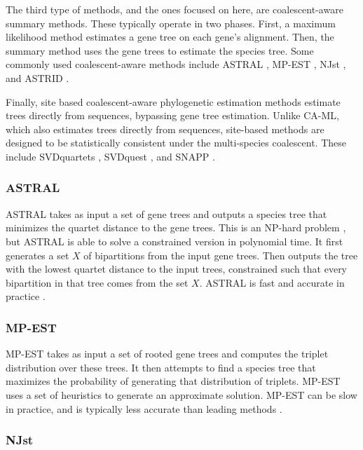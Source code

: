 \documentclass[tocnosub,noragright,centerchapter,fullpagesingle,12pt]{uiuc_csthesis18}
\begin{document}
The third type of methods, and the ones focused on here, are coalescent-aware summary methods. These typically operate in two phases. First, a maximum likelihood method estimates a gene tree on each gene's alignment. Then, the summary method uses the gene trees to estimate the species tree. Some commonly used coalescent-aware methods include ASTRAL \cite{mirarab2014astral,mirarab2015astral,astral3,ASTRAL-MP}, MP-EST \cite{MPEST}, NJst \cite{liu2011estimating}, and ASTRID \cite{vachaspati2015astrid}. 

Finally, site based coalescent-aware phylogenetic estimation methods estimate trees directly from sequences, bypassing gene tree estimation. Unlike CA-ML, which also estimates trees directly from sequences, site-based methods are designed to be statistically consistent under the multi-species coalescent.  These include SVDquartets \cite{chifman2014quartet}, SVDquest \cite{vachaspati2018svdquest}, and SNAPP \cite{bryant2012inferring}.

\subsubsection{ASTRAL}

ASTRAL takes as input a set of gene trees and outputs a species tree that minimizes the quartet distance to the gene trees. This is an NP-hard problem \cite{jiang2001polynomial}, but ASTRAL is able to solve a constrained version in polynomial time. It first generates a set $X$ of bipartitions from the input gene trees. Then outputs the tree with the lowest quartet distance to the input trees, constrained such that every bipartition in that tree comes from the set $X$. ASTRAL is fast and accurate in practice \cite{ASTRAL-MP,vachaspati2015astrid}.

\subsubsection{MP-EST}

MP-EST takes as input a set of rooted gene trees and computes the triplet distribution over these trees. It then attempts to find a species tree that maximizes the probability of generating that distribution of triplets. MP-EST uses a set of heuristics to generate an approximate solution. MP-EST can be slow in practice, and is typically less accurate than leading methods \cite{vachaspati2015astrid,davidson2015phylogenomic}.

\subsubsection{NJst}
\end{document}
